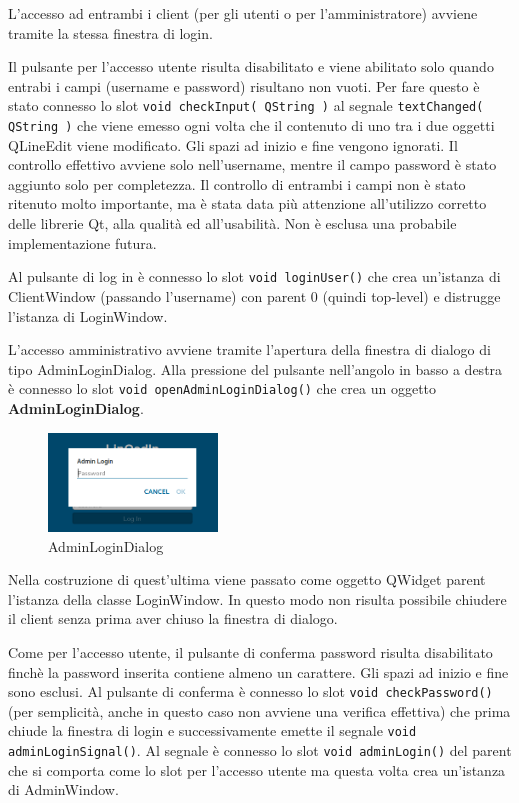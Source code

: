 \documentclass[a4paper]{article}
\begin{document}
L'accesso ad entrambi i client (per gli utenti o per l'amministratore) avviene tramite la stessa finestra di login.

Il pulsante per l'accesso utente risulta disabilitato e viene abilitato solo quando entrabi i campi (username e password) risultano non vuoti. Per fare questo è stato connesso lo slot \texttt{void checkInput( QString )} al segnale \texttt{textChanged( QString )} che viene emesso ogni volta che il contenuto di uno tra i due oggetti QLineEdit viene modificato. Gli spazi ad inizio e fine vengono ignorati. Il controllo effettivo avviene solo nell'username, mentre il campo password è stato aggiunto solo per completezza. Il controllo di entrambi i campi non è stato ritenuto molto importante, ma è stata data più attenzione all'utilizzo corretto delle librerie Qt, alla qualità ed all'usabilità. Non è esclusa una probabile implementazione futura.

Al pulsante di log in è connesso lo slot \texttt{void loginUser()} che crea un'istanza di ClientWindow (passando l'username) con parent 0 (quindi top-level) e distrugge l'istanza di LoginWindow.

L'accesso amministrativo avviene tramite l'apertura della finestra di dialogo di tipo AdminLoginDialog. Alla pressione del pulsante nell'angolo in basso a destra è connesso lo slot \texttt{void openAdminLoginDialog()} che crea un oggetto \textbf{AdminLoginDialog}.

\begin{figure}[!ht]
\centering
\includegraphics[width=0.4\textwidth]{AdminLoginDialog.png}
\caption{AdminLoginDialog}
\end{figure}

Nella costruzione di quest'ultima viene passato come oggetto QWidget parent l'istanza della classe LoginWindow. In questo modo non risulta possibile chiudere il client senza prima aver chiuso la finestra di dialogo.

Come per l'accesso utente, il pulsante di conferma password risulta disabilitato finchè la password inserita contiene almeno un carattere. Gli spazi ad inizio e fine sono esclusi. Al pulsante di conferma è connesso lo slot \texttt{void checkPassword()} (per semplicità, anche in questo caso non avviene una verifica effettiva) che prima chiude la finestra di login e successivamente emette il segnale \texttt{void adminLoginSignal()}. Al segnale è connesso lo slot \texttt{void adminLogin()} del parent che si comporta come lo slot per l'accesso utente ma questa volta crea un'istanza di AdminWindow.
\end{document}
